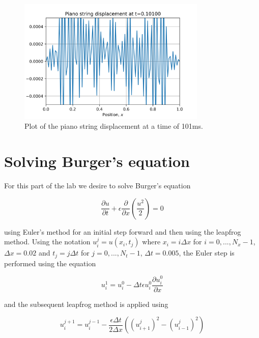 \documentclass{article}
\begin{document}
\begin{figure}[H]
	\centering
	\includegraphics[width=0.8\textwidth]{../images/q2_plot_101.png}
	\caption{Plot of the piano string displacement at a time of 101ms.}
	\label{fig:q2_101}
\end{figure}


\section{Solving Burger's equation}
For this part of the lab we desire to solve Burger's equation

\begin{equation}
	\frac{\partial u}{\partial t} + \epsilon \frac{\partial}{\partial x}(\frac{u^2}{2}) = 0
\end{equation}

using Euler's method for an initial step forward and then using the leapfrog method.
Using the notation $u^j_i = u(x_i, t_j)$ where $x_i = i\Delta x$ for $i=0,...,N_x-1$, $\Delta x=0.02$ and $t_j = j\Delta t$ for $j=0,...,N_t-1$, $\Delta t=0.005$, the Euler step is performed using the equation

\begin{equation}
	u^1_i = u^0_i - \Delta t\epsilon u^0_i\frac{\partial u^0_i}{\partial x}
\end{equation}

and the subsequent leapfrog method is applied using

\begin{equation}
	u^{j+1}_i = u^{j-1}_i - \frac{\epsilon\Delta t}{2\Delta x}((u^j_{i+1})^2 - (u^j_{i-1})^2)
\end{equation}
\end{document}
